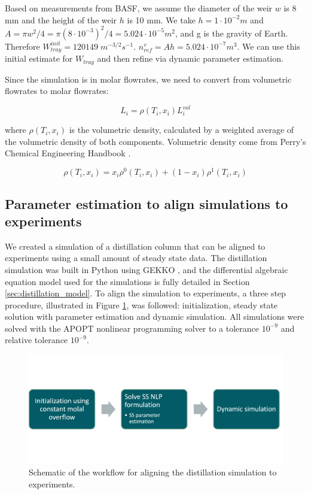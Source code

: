Based on measurements from BASF, we assume the diameter of the weir $w$ is 8 mm and the height of the weir $h$ is 10 mm. We take $h = 1\cdot10^{-2} m$ and $A=\pi w^2/4 = \pi(8 \cdot 10^{-3})^2/4 = 5.024 \cdot 10^{-5} m^2$, and g is the gravity of Earth. Therefore $W_{tray}^{init}=120149 \; m^{-3/2}s^{-1}$. $n^v_{ref}=Ah=5.024 \cdot 10^{-7} m^3$.  We can use this initial estimate for $W_{tray}$ and then refine via dynamic parameter estimation.

Since the simulation is in molar flowrates, we need to convert from volumetric flowrates to molar flowrates:

\begin{equation}
    L_i = \rho(T_i, x_i)L^{vol}_i  
\end{equation}


where $\rho(T_i,x_i)$ is the volumetric density, calculated by a weighted average of the volumetric density of both components. Volumetric density come from Perry’s Chemical Engineering Handbook \cite{Perrys2018}.

\begin{equation}
    \rho(T_i, x_i) = x_i\rho^0(T_i, x_i) + (1-x_i)\rho^1(T_i, x_i)
\end{equation}


\subsection{Parameter estimation to align simulations to experiments}

We created a simulation of a distillation column that can be aligned to experiments using a small amount of steady state data. The distillation simulation was built in Python using GEKKO \cite{Beal2018}, and the differential algebraic equation model used for the simulations is fully detailed in Section \ref{sec:distillation_model}. To align the simulation to experiments, a three step procedure, illustrated in Figure \ref{fig:simulation_workflow}, was followed: initialization, steady state solution with parameter estimation and dynamic simulation. All simulations were solved with the APOPT nonlinear programming solver to a tolerance $10^{-9}$ and relative tolerance $10^{-9}$.

\begin{figure}
    \centering
    \includegraphics[width=\textwidth]{gfx/Chapter06/simulation_workflow.png}
    \caption{Schematic of the workflow for aligning the distillation simulation to experiments.}
    \label{fig:simulation_workflow}
\end{figure}

